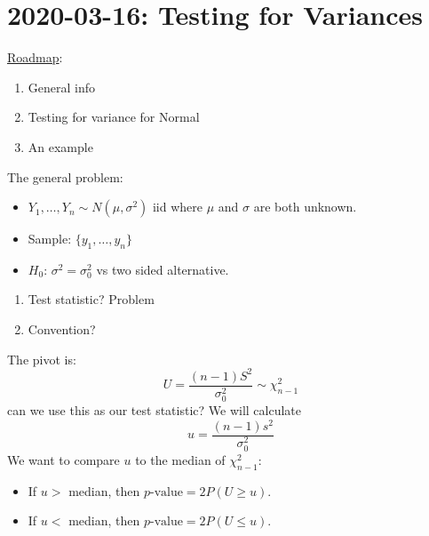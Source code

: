 \section{2020-03-16: Testing for Variances}
\underline{Roadmap}:
\begin{enumerate}[label=(\roman*)]
    \item General info
    \item Testing for variance for Normal
    \item An example
\end{enumerate}
The general problem:
\begin{itemize}
    \item $ Y_1,\ldots ,Y_n \sim N(\mu,\sigma^2)$ iid
          where $ \mu $ and $ \sigma $ are both unknown.
    \item Sample: $ \{y_1,\ldots ,y_n\} $
    \item $ H_0 $: $ \sigma^2=\sigma_0^2 $ vs two sided alternative.
\end{itemize}

\begin{enumerate}[label=(\roman*)]
    \item Test statistic? Problem
    \item Convention?
\end{enumerate}
The pivot is:
\[ U=\frac{(n-1)S^2}{\sigma_0^2} \sim \chi^2_{n-1} \]
can we use this as our test statistic? We will calculate
\[ u=\frac{(n-1)s^2}{\sigma_0^2} \]
We want to compare $ u $ to the median of $ \chi^2_{n-1} $:
\begin{itemize}
    \item If $ u> $ median, then $ p\text{-value}=2P(U\geqslant u) $.
    \item If $ u< $ median, then $ p\text{-value}=2P(U\leqslant u) $.
\end{itemize}


